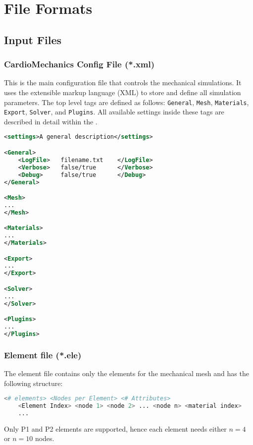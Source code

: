 \section{File Formats}
\label{sec:fileformats}

\subsection{Input Files}
\label{subsec:infiles}

\subsubsection{CardioMechanics Config File (*.xml)}
\label{subsubsec:CardioMechanicsConfig}

This is the main configuration file that controls the mechanical simulations.
It uses the extensible markup language (XML) to store and define all simulation parameters.
The top level tags are defined as follows: \verb|General|, \verb|Mesh|, \verb|Materials|, \verb|Export|, \verb|Solver|, and \verb|Plugins|.
All available settings inside these tags are described in detail within the .
\begin{lstlisting}[language=XML,caption=CardioMechanics Config File (*.xml)]
<settings>A general description</settings>

<General>
    <LogFile> 	filename.txt 	</LogFile>
    <Verbose> 	false/true 	    </Verbose>
    <Debug>  	false/true 		</Debug>
</General>

<Mesh>
...
</Mesh>

<Materials>
...
</Materials>

<Export>
...
</Export>

<Solver>
...
</Solver>

<Plugins>
...
</Plugins>

\end{lstlisting}

\subsubsection{Element file (*.ele)}
\label{eleFile}

The element file contains only the elements for the mechanical mesh and has the following structure:
\begin{lstlisting}[language=Bash,caption=Element file (*.ele)]
    <# elements> <Nodes per Element> <# Attributes>
    <Element Index> <node 1> <node 2> ... <node n> <material index>
    ...
\end{lstlisting}
Only P1 and P2 elements are supported, hence each element needs either $n=4$ or $n=10$ nodes.

